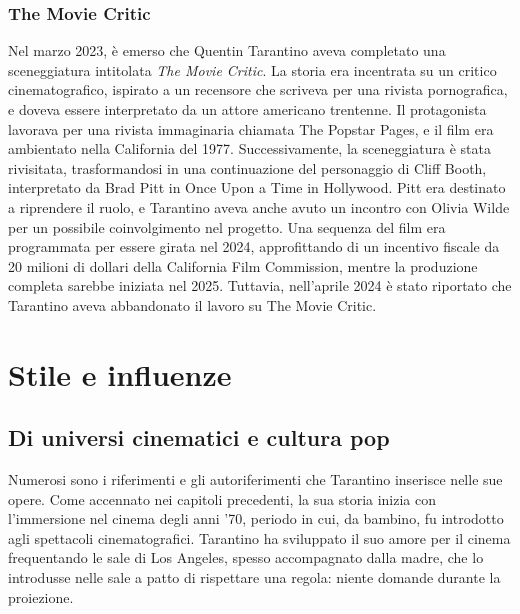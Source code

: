 \documentclass[12pt]{article} %
\begin{document}
\begin{flushleft}
\subsubsection*{The Movie Critic}
Nel marzo 2023, è emerso che Quentin Tarantino aveva completato una sceneggiatura intitolata \textit{The Movie Critic}. La storia era incentrata su un critico cinematografico, ispirato a un recensore che scriveva per una rivista pornografica, e doveva essere interpretato da un attore americano trentenne. Il protagonista lavorava per una rivista immaginaria chiamata The Popstar Pages, e il film era ambientato nella California del 1977.   
Successivamente, la sceneggiatura è stata rivisitata, trasformandosi in una continuazione del personaggio di Cliff Booth, interpretato da Brad Pitt in Once Upon a Time in Hollywood. Pitt era destinato a riprendere il ruolo, e Tarantino aveva anche avuto un incontro con Olivia Wilde per un possibile coinvolgimento nel progetto.  
Una sequenza del film era programmata per essere girata nel 2024, approfittando di un incentivo fiscale da 20 milioni di dollari della California Film Commission, mentre la produzione completa sarebbe iniziata nel 2025. Tuttavia, nell'aprile 2024 è stato riportato che Tarantino aveva abbandonato il lavoro su The Movie Critic.
\end{flushleft}
\break

\section{Stile e influenze}
\subsection{Di universi cinematici e cultura pop}
\begin{flushleft}
    Numerosi sono i riferimenti e gli autoriferimenti che Tarantino inserisce nelle sue opere. Come accennato nei capitoli precedenti, la sua storia inizia con l'immersione nel cinema degli anni '70, periodo in cui, da bambino, fu introdotto agli spettacoli cinematografici.
    Tarantino ha sviluppato il suo amore per il cinema frequentando le sale di Los Angeles, spesso accompagnato dalla madre, che lo introdusse nelle sale a patto di rispettare una regola: niente domande durante la proiezione.
\end{flushleft}
\end{document}
